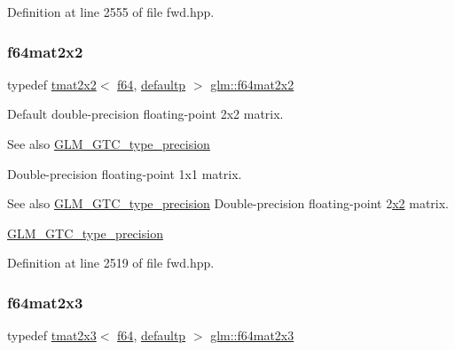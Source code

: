 Definition at line 2555 of file fwd.\+hpp.

\mbox{\label{group__gtc__type__precision_ga1e14d8b4e18898be51cd719fda213dcc}} 
\subsubsection{\texorpdfstring{f64mat2x2}{f64mat2x2}}
{\footnotesize\ttfamily typedef \mbox{\hyperlink{structglm_1_1tmat2x2}{tmat2x2}}$<$ \mbox{\hyperlink{group__gtc__type__precision_ga2bba392e555124b36cde6abba349bab3}{f64}}, \mbox{\hyperlink{namespaceglm_a0f04f086094c747d227af4425893f545a9d21ccd8b5a009ec7eb7677befc3bf51}{defaultp}} $>$ \mbox{\hyperlink{group__gtc__type__precision_ga1e14d8b4e18898be51cd719fda213dcc}{glm\+::f64mat2x2}}}

Default double-\/precision floating-\/point 2x2 matrix. \begin{DoxySeeAlso}{See also}
\mbox{\hyperlink{group__gtc__type__precision}{G\+L\+M\+\_\+\+G\+T\+C\+\_\+type\+\_\+precision}}
\end{DoxySeeAlso}
Double-\/precision floating-\/point 1x1 matrix. \begin{DoxySeeAlso}{See also}
\mbox{\hyperlink{group__gtc__type__precision}{G\+L\+M\+\_\+\+G\+T\+C\+\_\+type\+\_\+precision}} Double-\/precision floating-\/point 2\mbox{\hyperlink{glad_8h_ad2cea6eadb01f017f0d57e7edf0ce988}{x2}} matrix. 

\mbox{\hyperlink{group__gtc__type__precision}{G\+L\+M\+\_\+\+G\+T\+C\+\_\+type\+\_\+precision}} 
\end{DoxySeeAlso}


Definition at line 2519 of file fwd.\+hpp.

\mbox{\label{group__gtc__type__precision_ga6d0196bded514d55e26e0f68dd38b37b}} 
\subsubsection{\texorpdfstring{f64mat2x3}{f64mat2x3}}
{\footnotesize\ttfamily typedef \mbox{\hyperlink{structglm_1_1tmat2x3}{tmat2x3}}$<$ \mbox{\hyperlink{group__gtc__type__precision_ga2bba392e555124b36cde6abba349bab3}{f64}}, \mbox{\hyperlink{namespaceglm_a0f04f086094c747d227af4425893f545a9d21ccd8b5a009ec7eb7677befc3bf51}{defaultp}} $>$ \mbox{\hyperlink{group__gtc__type__precision_ga6d0196bded514d55e26e0f68dd38b37b}{glm\+::f64mat2x3}}}

